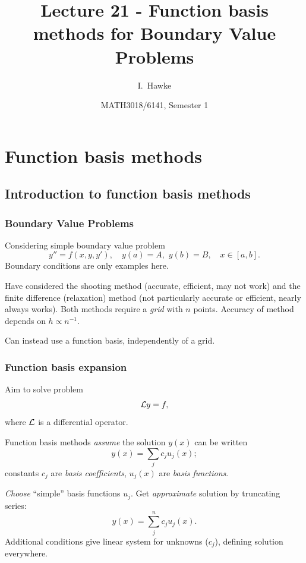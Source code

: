 \documentclass{beamer}
\title[Lecture 21] %
{Lecture 21 - Function basis methods for Boundary Value Problems}
\author[I. Hawke] %
{I.~Hawke}
\institute[University of Southampton] %
{
  School of Mathematics, \\
  University of Southampton, UK
}
\date[Semester 1] %
{MATH3018/6141, Semester 1}
\begin{document}
\begin{frame}
  \titlepage
\end{frame}

\section{Function basis methods}

\subsection{Introduction to function basis methods}

\begin{frame}
  \frametitle{Boundary Value Problems}

  Considering simple boundary value problem
  \begin{equation*}
    y'' = f(x, y, y'), \quad y(a) = A, \,\, y(b) = B, \quad x \in [a,b].
  \end{equation*} \pause
  Boundary conditions are only examples here. \pause

  \vspace{1ex}

  Have considered the shooting method (accurate, efficient, may not
  work) and the finite difference (relaxation) method (not
  particularly accurate or efficient, nearly always works). \pause
  Both methods require a \emph{grid} with $n$ points. Accuracy of
  method depends on $h \propto n^{-1}$. \pause

  \vspace{1ex}

  Can instead use a function basis, independently of a grid.

\end{frame}

\begin{frame}
  \frametitle{Function basis expansion}

  Aim to solve problem
  \begin{equation*}
    {\cal L} y = f,
  \end{equation*}
  where ${\cal L}$ is a differential operator. \pause

  \vspace{1ex}

  Function basis methods \emph{assume} the solution $y(x)$ can be
  written
  \begin{equation*}
    y(x) = \sum_{j} c_j u_j (x);
  \end{equation*}
  constants $c_j$ are \emph{basis coefficients}, $u_j(x)$ are
  \emph{basis functions}. \pause

  \vspace{1ex}

  \emph{Choose} ``simple'' basis functions $u_j$. Get
  \emph{approximate} solution by truncating series:
  \begin{equation*}
    y(x) = \sum_{j}^n c_j u_j (x).
  \end{equation*} \pause
  Additional conditions give linear system for unknowns ($c_j$),
  defining solution everywhere.

\end{frame}
\end{document}
